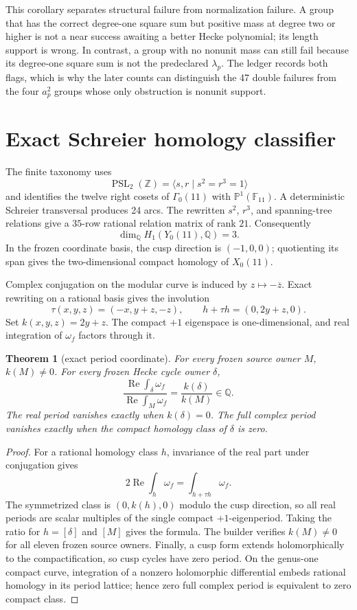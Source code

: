 \documentclass[11pt]{article}
\newtheorem{theorem}{Theorem}[section]
\theoremstyle{definition}
\theoremstyle{remark}
\newcommand{\G}{\Gamma_0(11)}
\newcommand{\QQ}{\mathbb Q}
\begin{document}
This corollary separates structural failure from normalization failure. A group that has the correct degree-one square sum but positive mass at degree two or higher is not a near success awaiting a better Hecke polynomial; its length support is wrong. In contrast, a group with no nonunit mass can still fail because its degree-one square sum is not the predeclared $\lambda_p$. The ledger records both flags, which is why the later counts can distinguish the 47 double failures from the four $a_p^2$ groups whose only obstruction is nonunit support.

\section{Exact Schreier homology classifier}

The finite taxonomy uses
\[
\operatorname{PSL}_2(\mathbb Z)=\langle s,r\mid s^2=r^3=1\rangle
\]
and identifies the twelve right cosets of $\G$ with $\mathbb P^1(\mathbb F_{11})$. A deterministic Schreier transversal produces 24 arcs. The rewritten $s^2$, $r^3$, and spanning-tree relations give a $35$-row rational relation matrix of rank $21$. Consequently
\[
\dim_\QQ H_1(Y_0(11),\QQ)=3.
\]
In the frozen coordinate basis, the cusp direction is $(-1,0,0)$; quotienting its span gives the two-dimensional compact homology of $X_0(11)$.

Complex conjugation on the modular curve is induced by $z\mapsto-\overline z$. Exact rewriting on a rational basis gives the involution
\[
\tau(x,y,z)=(-x,y+z,-z),
\qquad
h+\tau h=(0,2y+z,0).
\]
Set $k(x,y,z)=2y+z$. The compact $+1$ eigenspace is one-dimensional, and real integration of $\omega_f$ factors through it.

\begin{theorem}[exact period coordinate]\label{thm:k}
For every frozen source owner $M$, $k(M)\neq0$. For every frozen Hecke cycle owner $\delta$,
\[
\frac{\operatorname{Re}\int_\delta\omega_f}
{\operatorname{Re}\int_M\omega_f}
=\frac{k(\delta)}{k(M)}\in\QQ.
\]
The real period vanishes exactly when $k(\delta)=0$. The full complex period vanishes exactly when the compact homology class of $\delta$ is zero.
\end{theorem}

\begin{proof}
For a rational homology class $h$, invariance of the real part under conjugation gives
\[
2\operatorname{Re}\int_h\omega_f=\int_{h+\tau h}\omega_f.
\]
The symmetrized class is $(0,k(h),0)$ modulo the cusp direction, so all real periods are scalar multiples of the single compact $+1$-eigenperiod. Taking the ratio for $h=[\delta]$ and $[M]$ gives the formula. The builder verifies $k(M)\neq0$ for all eleven frozen source owners. Finally, a cusp form extends holomorphically to the compactification, so cusp cycles have zero period. On the genus-one compact curve, integration of a nonzero holomorphic differential embeds rational homology in its period lattice; hence zero full complex period is equivalent to zero compact class.
\end{proof}
\end{document}
